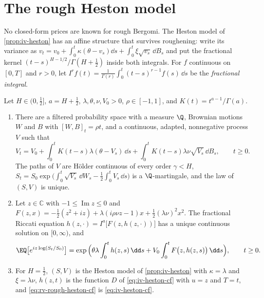 
\section{The rough Heston model}\label{sec:rv-rough-heston}

No closed-form prices are known for rough Bergomi. The Heston model of \cref{prop:iv-heston} has an affine structure that
survives roughening: write its variance as $v_t=v_0+\int_0^t\kappa(\theta-v_s)\dd s+\int_0^t\xi\sqrt{v_s}\,\dd B_s$ and
put the fractional kernel $(t-s)^{H-1/2}/\Gamma(H+\frac12)$ inside both integrals. For $f$ continuous on $[0,T]$ and
$r>0$, let $I^rf(t)=\frac1{\Gamma(r)}\int_0^t(t-s)^{r-1}f(s)\,\dd s$ be the \emph{fractional integral}.

\begin{theorem}\label{thm:rv-rough-heston}
Let $H\in(0,\frac12]$, $a=H+\frac12$, $\lambda,\theta,\nu,V_0>0$, $\rho\in[-1,1]$, and
$K(t)=t^{a-1}/\Gamma(a)$.
\begin{enumerate}[label=(\roman*)]
  \item There are a filtered probability space with a measure $\Q$, Brownian motions $W$ and $B$ with
    $[W,B]_t=\rho t$, and a continuous, adapted, nonnegative process $V$ such that
    \begin{equation}\label{eq:rv-rough-heston}
      V_t=V_0+\int_0^tK(t-s)\lambda(\theta-V_s)\,\dd s+\int_0^tK(t-s)\lambda\nu\sqrt{V_s}\,\dd B_s,\qquad t\ge0 .
    \end{equation}
    The paths of $V$ are H\"older continuous of every order $\gamma<H$,
    $S_t=S_0\exp\big(\int_0^t\sqrt{V_s}\,\dd W_s-\frac12\int_0^tV_s\,\dd s\big)$ is a $\Q$-martingale, and the
    law of $(S,V)$ is unique.
  \item Let $z\in\mathbb C$ with $-1\le\operatorname{Im}z\le0$ and
    $F(z,x)=-\frac12(z^2+iz)+\lambda(i\rho\nu z-1)x+\frac12(\lambda\nu)^2x^2$. The fractional Riccati equation
    $h(z,\cdot)=I^a\big[F(z,h(z,\cdot))\big]$ has a unique continuous solution on $[0,\infty)$, and
    \begin{equation}\label{eq:rv-rough-heston-cf}
      \EQ\big[e^{iz\log(S_t/S_0)}\big]=\exp\Big(\theta\lambda\int_0^th(z,s)\,\dd s+V_0\int_0^tF\big(z,h(z,s)\big)\,\dd s\Big),\qquad t\ge0 .
    \end{equation}
  \item For $H=\frac12$, $(S,V)$ is the Heston model of \cref{prop:iv-heston} with $\kappa=\lambda$ and $\xi=\lambda\nu$,
    $h(z,t)$ is the function $D$ of \eqref{eq:iv-heston-cf} with $u=z$ and $T=t$, and \eqref{eq:rv-rough-heston-cf} is
    \eqref{eq:iv-heston-cf}.
\end{enumerate}
\end{theorem}

